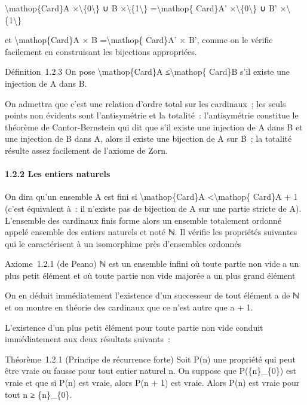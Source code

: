 \documentclass[]{article}
\begin{document}
\textbackslash{}mathop\{Card\}A ×\textbackslash{}\{0\textbackslash{}\} ∪
B ×\textbackslash{}\{1\textbackslash{}\} =\textbackslash{}mathop\{
Card\}A' ×\textbackslash{}\{0\textbackslash{}\} ∪ B'
×\textbackslash{}\{1\textbackslash{}\}

et \textbackslash{}mathop\{Card\}A × B =\textbackslash{}mathop\{
Card\}A' × B', comme on le vérifie facilement en construisant les
bijections appropriées.

Définition~1.2.3 On pose \textbackslash{}mathop\{Card\}A
≤\textbackslash{}mathop\{ Card\}B s'il existe une injection de A dans B.

On admettra que c'est une relation d'ordre total sur les cardinaux~; les
seuls points non évidents sont l'antisymétrie et la totalité~:
l'antisymétrie constitue le théorème de Cantor-Bernstein qui dit que
s'il existe une injection de A dans B et une injection de B dans A,
alors il existe une bijection de A sur B~; la totalité résulte assez
facilement de l'axiome de Zorn.

\paragraph{1.2.2 Les entiers naturels}

On dira qu'un ensemble A est fini si \textbackslash{}mathop\{Card\}A
\textless{}\textbackslash{}mathop\{ Card\}A + 1 (c'est équivalent à~: il
n'existe pas de bijection de A sur une partie stricte de A). L'ensemble
des cardinaux finis forme alors un ensemble totalement ordonné appelé
ensemble des entiers naturels et noté ℕ. Il vérifie les propriétés
suivantes qui le caractérisent à un isomorphime près d'ensembles
ordonnés

Axiome~1.2.1 (de Peano) ℕ est un ensemble infini où toute partie non
vide a un plus petit élément et où toute partie non vide majorée a un
plus grand élément

On en déduit immédiatement l'existence d'un successeur de tout élément a
de ℕ et on montre en théorie des cardinaux que ce n'est autre que a + 1.

L'existence d'un plus petit élément pour toute partie non vide conduit
immédiatement aux deux résultats suivants~:

Théorème~1.2.1 (Principe de récurrence forte) Soit P(n) une propriété
qui peut être vraie ou fausse pour tout entier naturel n. On suppose que
P(\{n\}\_\{0\}) est vraie et que si P(n) est vraie, alors P(n + 1) est
vraie. Alors P(n) est vraie pour tout n ≥ \{n\}\_\{0\}.
\end{document}

